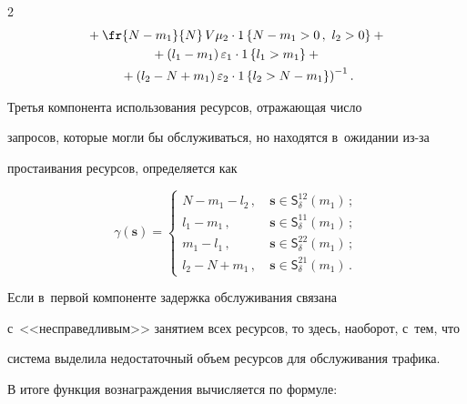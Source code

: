 \begin{multicols}{2}
\begin{multline*}
  {}+\fr{N-


m_1}{N}\,V\mu_2\cdot 1\left\{ N-m_1>0\,,\ l_2>0\right\}+{}\\


  {}+


\left(l_1-m_1\right)\varepsilon_1\cdot 1\left\{ l_1>m_1\right\} +{}\\


    \left.{}+\left( l_2-


N+m_1\right)\varepsilon_2 \cdot 1\left\{l_2>N-m_1\right\}\right)^{-1}.




  \end{multline*}


  


  Третья компонента использования ресурсов, отражающая число 


запросов, которые могли бы обслуживаться, но находятся в~ожидании из-за 


простаивания ресурсов, определяется как 


  \begin{equation*}


  \gamma(\bm{s})= \begin{cases}


  N-m_1-l_2\,, & \ \bm{s}\in \mathsf{S}_\delta^{12}(m_1)\,;\\


  l_1-m_1\,, &\ \bm{s}\in \mathsf{S}_\delta^{11}(m_1)\,;\\


  m_1-l_1\,, &\ \bm{s}\in \mathsf{S}_\delta^{22}(m_1)\,;\\


  l_2-N+m_1\,, &\ \bm{s}\in \mathsf{S}_\delta^{21}(m_1)\,.


  \end{cases}




  \end{equation*}


    Если в~первой компоненте задержка обслуживания связана 


    с~<<несправедливым>> занятием всех ресурсов, то здесь, наоборот, с~тем, что 


система выделила недостаточный объем ресурсов для обслуживания трафика. 


  


  В итоге функция вознаграждения вычисляется по формуле:



\end{multicols}
